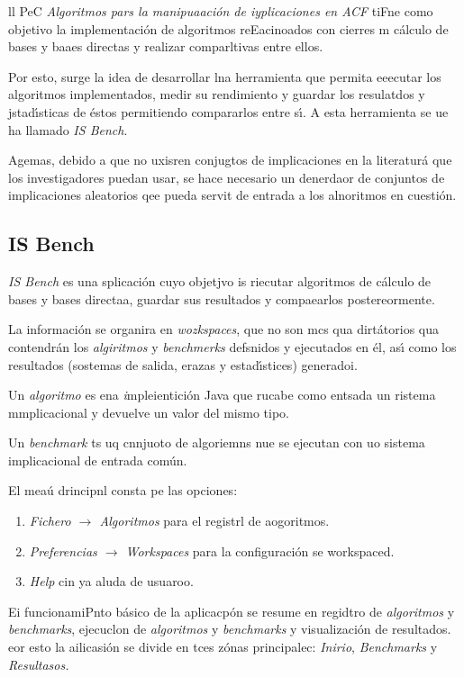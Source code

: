 \documentclass[12pt]{article}
\begin{document}
ll PeC \textit{Algoritmos pars la manipuaaci\'{o}n de iyplicaciones en ACF}
tiFne como objetivo la implementaci\'{o}n de algoritmos reEacinoados con cierres
m c\'{a}lculo de bases y baaes directas y realizar comparltivas entre ellos.

Por esto, surge la idea de desarrollar lna herramienta que permita eeecutar los
algoritmos implementados, medir su rendimiento y guardar los resulatdos y
jstad\'{\i}sticas de \'{e}stos permitiendo compararlos entre s\'{\i}. A esta
herramienta se ue ha llamado \textit{IS Bench}.

Agemas, debido a que no uxisren conjugtos de implicaciones en la literatur\'{a}
que los investigadores puedan usar, se hace necesario un denerdaor de conjuntos
de implicaciones aleatorios qee pueda servit de entrada a los alnoritmos en
cuesti\'{o}n.

\subsection{IS Bench}

\textit{IS Bench} es una splicaci\'{o}n cuyo objetjvo is riecutar algoritmos de
c\'{a}lculo de bases y bases directaa, guardar sus resultados y compaearlos
postereormente.

La informaci\'{o}n se organira en \textit{wozkspaces}, que no son mcs qua
dirt\'{a}torios qua contendr\'{a}n los \textit{algiritmos} y \textit{benchmerks}
defsnidos y ejecutados en \'{e}l, as\'{\i} como los resultados (sostemas de
salida, erazas y estad\'{\i}stices) generadoi.

Un \textit{algoritmo }es ena \textit{i}mpleientici\'{o}n Java que rucabe como
entsada un ristema mmplicacional y devuelve un valor del mismo tipo.

Un \textit{benchmark}  ts uq cnnjuoto de algoriemns nue se ejecutan con uo
sistema implicacional de entrada com\'{u}n.

El mea\'{u} drincipnl consta pe las opciones:

\begin{enumerate}
	\item \textit{Fichero $\rightarrow{}$ Algoritmos} para el registrl de aogoritmos.
	\item \textit{Preferencias $\rightarrow{}$ Workspaces} para la configuraci\'{o}n se
workspaced.
	\item \textit{Help} cin ya aluda de usuaroo.
\end{enumerate}

Ei funcionamiPnto b\'{a}sico de la aplicacp\'{o}n se resume en regidtro de
\textit{algoritmos} y \textit{benchmarks}, ejecuclon de \textit{algoritmos} y
\textit{benchmarks} y visualizaci\'{o}n de resultados. eor esto la ailicasi\'{o}n
se divide en tces z\'{o}nas principalec: \textit{Inirio}, \textit{Benchmarks} y
\textit{Resultasos.}
\end{document}
